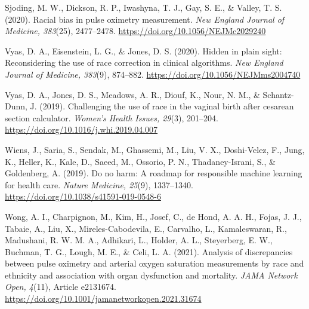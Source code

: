 \documentclass[12pt]{article}
\begin{document}
Sjoding, M. W., Dickson, R. P., Iwashyna, T. J., Gay, S. E., \& Valley, T. S. (2020). Racial bias in pulse oximetry measurement. \emph{New England Journal of Medicine, 383}(25), 2477--2478. \url{https://doi.org/10.1056/NEJMc2029240}

Vyas, D. A., Eisenstein, L. G., \& Jones, D. S. (2020). Hidden in plain sight: Reconsidering the use of race correction in clinical algorithms. \emph{New England Journal of Medicine, 383}(9), 874--882. \url{https://doi.org/10.1056/NEJMms2004740}

Vyas, D. A., Jones, D. S., Meadows, A. R., Diouf, K., Nour, N. M., \& Schantz-Dunn, J. (2019). Challenging the use of race in the vaginal birth after cesarean section calculator. \emph{Women's Health Issues, 29}(3), 201--204. \url{https://doi.org/10.1016/j.whi.2019.04.007}

Wiens, J., Saria, S., Sendak, M., Ghassemi, M., Liu, V. X., Doshi-Velez, F., Jung, K., Heller, K., Kale, D., Saeed, M., Ossorio, P. N., Thadaney-Israni, S., \& Goldenberg, A. (2019). Do no harm: A roadmap for responsible machine learning for health care. \emph{Nature Medicine, 25}(9), 1337--1340. \url{https://doi.org/10.1038/s41591-019-0548-6}

Wong, A. I., Charpignon, M., Kim, H., Josef, C., de Hond, A. A. H., Fojas, J. J., Tabaie, A., Liu, X., Mireles-Cabodevila, E., Carvalho, L., Kamaleswaran, R., Madushani, R. W. M. A., Adhikari, L., Holder, A. L., Steyerberg, E. W., Buchman, T. G., Lough, M. E., \& Celi, L. A. (2021). Analysis of discrepancies between pulse oximetry and arterial oxygen saturation measurements by race and ethnicity and association with organ dysfunction and mortality. \emph{JAMA Network Open, 4}(11), Article e2131674. \url{https://doi.org/10.1001/jamanetworkopen.2021.31674}
\endgroup
\end{document}
